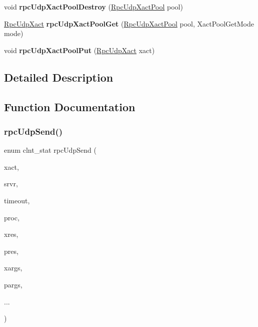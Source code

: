 \begin{DoxyCompactItemize}
\item 
\mbox{\label{group__rtems-nfsclient_gaa4528db9d66000e3f25648ee98aa094d}} 
void {\bfseries rpc\+Udp\+Xact\+Pool\+Destroy} (\mbox{\hyperlink{structRpcUdpXactPoolRec__}{Rpc\+Udp\+Xact\+Pool}} pool)
\item 
\mbox{\label{group__rtems-nfsclient_ga7256ab97363bceeea0e6f1a36b4f9d80}} 
\mbox{\hyperlink{structRpcUdpXactRec__}{Rpc\+Udp\+Xact}} {\bfseries rpc\+Udp\+Xact\+Pool\+Get} (\mbox{\hyperlink{structRpcUdpXactPoolRec__}{Rpc\+Udp\+Xact\+Pool}} pool, Xact\+Pool\+Get\+Mode mode)
\item 
\mbox{\label{group__rtems-nfsclient_ga309c242fe256e8f005cb3a668dee45ad}} 
void {\bfseries rpc\+Udp\+Xact\+Pool\+Put} (\mbox{\hyperlink{structRpcUdpXactRec__}{Rpc\+Udp\+Xact}} xact)
\end{DoxyCompactItemize}


\subsection{Detailed Description}


\subsection{Function Documentation}
\mbox{\label{group__rtems-nfsclient_ga00b3bdde30fc2fd22e2682893a894b25}} 
\subsubsection{\texorpdfstring{rpcUdpSend()}{rpcUdpSend()}}
{\footnotesize\ttfamily enum clnt\+\_\+stat rpc\+Udp\+Send (\begin{DoxyParamCaption}\item[{\mbox{\hyperlink{structRpcUdpXactRec__}{Rpc\+Udp\+Xact}}}]{xact,  }\item[{\mbox{\hyperlink{structRpcUdpServerRec__}{Rpc\+Udp\+Server}}}]{srvr,  }\item[{struct timeval $\ast$}]{timeout,  }\item[{u\+\_\+long}]{proc,  }\item[{xdrproc\+\_\+t}]{xres,  }\item[{caddr\+\_\+t}]{pres,  }\item[{xdrproc\+\_\+t}]{xargs,  }\item[{caddr\+\_\+t}]{pargs,  }\item[{}]{... }\end{DoxyParamCaption})}

